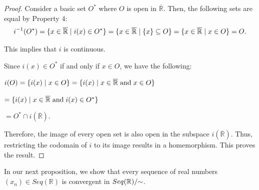 \documentclass{amsart}
\theoremstyle{definition}
\theoremstyle{plain}
\begin{document}
\begin{proof}
  
Consider a basic set $O^*$ where $O$ is open in $\overline{\mathbb{R}}$. Then, the following sets are equal by Property 4:
$$i^{-1}(O^*) = \{ x \in \overline{\mathbb{R}} \hspace{1mm} | \hspace{1mm} i(x) \in O^*\} = \{ x\in \overline{\mathbb{R}} \hspace{1mm} | \hspace{1mm} \{x\} \subseteq O\} = \{x\in \overline{\mathbb{R}} \hspace{1mm} | \hspace{1mm}  {x} \in O\} = O.$$

\noindent This implies  that $i$ is continuous. 

Since $i(x) \in O^*$ if and only if  $x \in O$, we have the following:

\begin{centering}
  
$i(O) = \{i(x) \hspace{1mm} | \hspace{1mm} x \in O \} = \{i(x) \hspace{1mm} | \hspace{1mm} x \in \overline{\mathbb{R}} \hspace{1mm} \text{and} \hspace{1mm} x \in O \}$
\vspace{3mm}

\hspace{40mm} $= \{i(x) \hspace{1mm} | \hspace{1mm} x \in \overline{\mathbb{R}} \hspace{1mm} \text{and} \hspace{1mm} i(x) \in O^* \}$ 


\vspace{3mm}

\hspace{5mm} $= O^* \cap i(\overline{\mathbb{R}}).$ 

\end{centering}


Therefore, the image of every open set is also open in the subspace $i(\overline{\mathbb{R}})$. Thus,
restricting the codomain of $i$ to its image results in a homemorphism. This proves the result.  
\end{proof}

In our next proposition, we show that every sequence of real numbers $(x_n) \in Seq(\mathbb{R})$ is convergent 
in $Seq(\mathbb{R})/\hspace{-1mm}\sim$. 
\end{document}
